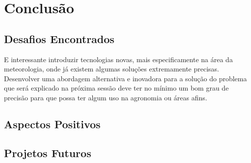 \chapter{Conclusão}
\label{c.conclusao}



\section{Desafios Encontrados}
\label{s.desafios}
E interessante introduzir tecnologias novas, mais especificamente na área da meteorologia, onde já existem algumas soluções extremamente precisas. Desenvolver uma abordagem alternativa e inovadora para a solução do problema que será explicado na próxima sessão deve ter no mínimo um bom grau de precisão para que possa ter algum uso na agronomia ou áreas afins.

\section{Aspectos Positivos}
\label{s.aspectos}

\section{Projetos Futuros}
\label{s.projetos}